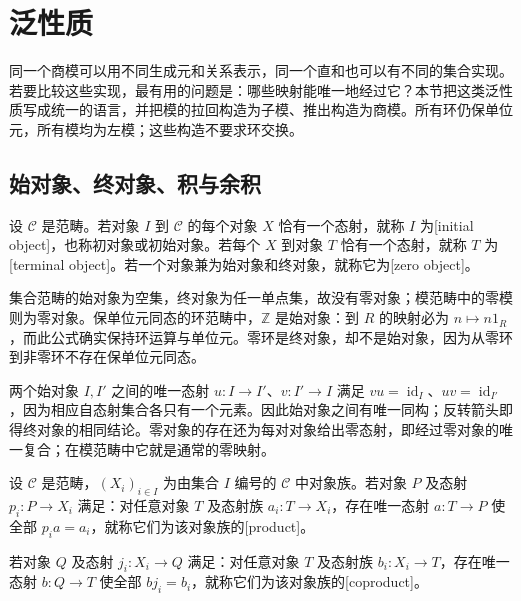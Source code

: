 
\section{泛性质}
\label{b2:sec:0503}

同一个商模可以用不同生成元和关系表示，同一个直和也可以有不同的集合实现。若要比较这些实现，最有用的问题是：哪些映射能唯一地经过它？本节把这类泛性质写成统一的语言，并把模的拉回构造为子模、推出构造为商模。所有环仍保单位元，所有模均为左模；这些构造不要求环交换。

%
%

\subsection{始对象、终对象、积与余积}
\label{b2:subsec:0503:01}

\begin{definition}\label{b2:def:initial-terminal-object}
	设 \(\mathcal C\) 是范畴。若对象 \(I\) 到 \(\mathcal C\) 的每个对象 \(X\) 恰有一个态射，就称 \(I\) 为[initial object]，也称初对象或初始对象。若每个 \(X\) 到对象 \(T\) 恰有一个态射，就称 \(T\) 为[terminal object]。若一个对象兼为始对象和终对象，就称它为[zero object]。
\end{definition}

集合范畴的始对象为空集，终对象为任一单点集，故没有零对象；模范畴中的零模则为零对象。保单位元同态的环范畴中，\(\mathbb Z\) 是始对象：到 \(R\) 的映射必为 \(n\mapsto n1_R\)，而此公式确实保持环运算与单位元。零环是终对象，却不是始对象，因为从零环到非零环不存在保单位元同态。

\ProseParagraphBreak
两个始对象 \(I,I'\) 之间的唯一态射 \(u:I\rightarrow I'\)、\(v:I'\rightarrow I\) 满足 \(vu=\operatorname{id}_I\)、\(uv=\operatorname{id}_{I'}\)，因为相应自态射集合各只有一个元素。因此始对象之间有唯一同构；反转箭头即得终对象的相同结论。零对象的存在还为每对对象给出零态射，即经过零对象的唯一复合；在模范畴中它就是通常的零映射。

\begin{definition}\label{b2:def:product-coproduct}
	设 \(\mathcal C\) 是范畴，\((X_i)_{i\in I}\) 为由集合 \(I\) 编号的 \(\mathcal C\) 中对象族。若对象 \(P\) 及态射 \(p_i:P\rightarrow X_i\) 满足：对任意对象 \(T\) 及态射族 \(a_i:T\rightarrow X_i\)，存在唯一态射 \(a:T\rightarrow P\) 使全部 \(p_i a=a_i\)，就称它们为该对象族的[product]。

	若对象 \(Q\) 及态射 \(j_i:X_i\rightarrow Q\) 满足：对任意对象 \(T\) 及态射族 \(b_i:X_i\rightarrow T\)，存在唯一态射 \(b:Q\rightarrow T\) 使全部 \(bj_i=b_i\)，就称它们为该对象族的[coproduct]。
\end{definition}

